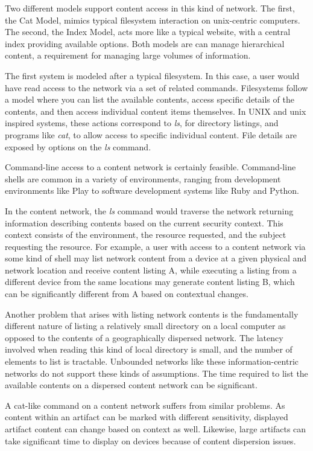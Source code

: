 Two different models support content access in this kind of network.  The first, the Cat Model, mimics typical filesystem interaction on unix-centric computers.  The second, the Index Model, acts more like a typical website, with a central index providing available options.  Both models are can manage hierarchical content, a requirement for managing large volumes of information.

The first system is modeled after a typical filesystem.  In this case, a user would have read access to the network via a set of related commands.  Filesystems follow a model where you can list the available contents, access specific details of the contents, and then access individual content items themselves.  In UNIX and unix inspired systems, these actions correspond to {\em ls}, for directory listings, and programs like {\em cat}, to allow access to specific individual content.  File details are exposed by options on the {\em ls} command.

Command-line access to a content network is certainly feasible.  Command-line shells are common in a variety of environments, ranging from development environments like Play to software development systems like Ruby and Python.

In the content network, the {\em ls} command would traverse the network returning information describing contents based on the current security context.  This context consists of the environment, the resource requested, and the subject requesting the resource.  For example, a user with access to a content network via some kind of shell may list network content from a device at a given physical and network location and receive content listing A, while executing a listing from a different device from the same locations may generate content listing B, which can be significantly different from A based on contextual changes.

Another problem that arises with listing network contents is the fundamentally different nature of listing a relatively small directory on a local computer as opposed to the contents of a geographically dispersed network.  The latency involved when reading this kind of local directory is small, and the number of elements to list is tractable.  Unbounded networks like these information-centric networks do not support these kinds of assumptions.  The time required to list the available contents on a dispersed content network can be significant.

A cat-like command on a content network suffers from similar problems.  As content within an artifact can be marked with different sensitivity, displayed artifact content can change based on context as well.  Likewise, large artifacts can take significant time to display on devices because of content dispersion issues.

